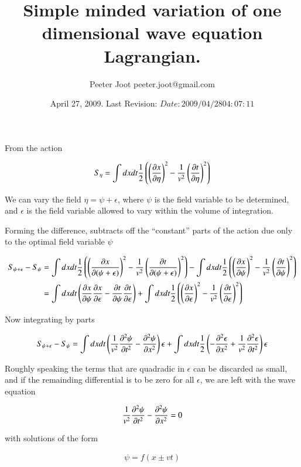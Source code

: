 \documentclass{article}
\title{ Simple minded variation of one dimensional wave equation Lagrangian. }
\author{Peeter Joot \quad peeter.joot@gmail.com }
\date{ April 27, 2009.  Last Revision: $Date: 2009/04/28 04:07:11 $ }
\newcommand{\PDSq}[2]{\frac{\partial^2 {#2}}{\partial {#1}^2}}
\begin{document}
\maketitle{}

From the action

\begin{align*}
S_\eta = \int dx dt \frac{1}{2} \left( \left(\frac{\partial{x}}{\partial {\eta}}\right)^2 - \frac{1}{v^2} \left(\frac{\partial{t}}{\partial {\eta}}\right)^2 \right)
\end{align*}

We can vary the field $\eta = \psi + \epsilon$, where $\psi$ is the field variable to be determined, and $\epsilon$ is the field variable allowed to vary within the volume of integration.

Forming the difference, subtracts off the ``constant'' parts of the action due only to the optimal field variable $\psi$

\begin{align*}
S_{\psi + \epsilon} - S_\psi
&=
\int dx dt \frac{1}{2} \left( \left(\frac{\partial{x}}{\partial {(\psi + \epsilon)}}\right)^2 - \frac{1}{v^2} \left(\frac{\partial{t}}{\partial {(\psi + \epsilon)}}\right)^2 \right)
-\int dx dt \frac{1}{2} \left( \left(\frac{\partial{x}}{\partial {\psi}}\right)^2 - \frac{1}{v^2} \left(\frac{\partial{t}}{\partial {\psi}}\right)^2 \right) \\
&=
\int dx dt \left( \frac{\partial{x}}{\partial {\psi}}\frac{\partial{x}}{\partial {\epsilon}} - \frac{\partial{t}}{\partial {\psi}}\frac{\partial{t}}{\partial {\epsilon}} \right)
+ \int dx dt \frac{1}{2} \left( \left(\frac{\partial{x}}{\partial {\epsilon }}\right)^2 - \frac{1}{v^2} \left(\frac{\partial{t}}{\partial {\epsilon }}\right)^2 \right) \\
\end{align*}

Now integrating by parts

\begin{align*}
S_{\psi + \epsilon} - S_\psi
&=
\int dx dt \left( \inv{v^2} \PDSq{t}{\psi} -\PDSq{x}{\psi} \right) {\epsilon} 
+ \int dx dt \inv{2} \left( -\PDSq{x}{\epsilon } + \inv{v^2} \PDSq{t}{\epsilon } \right) \epsilon \\
\end{align*}

Roughly speaking the terms that are quadradic in $\epsilon$ can be discarded as small, and if the remainding differential
is to be zero for all $\epsilon$, we are left with the wave equation

\begin{align*}
\inv{v^2} \PDSq{t}{\psi} -\PDSq{x}{\psi} = 0 
\end{align*}

with solutions 
of the form 

\begin{align*}
\psi = f(x \pm vt)
\end{align*}



\end{document}
